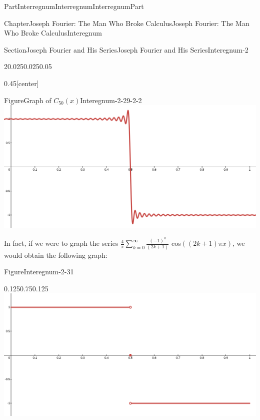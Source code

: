\documentclass[oneside,10pt,]{book}
\numberwithin{equation}{part}
\begin{document}
\begin{partptx}{Part}{Interregnum}{}{Interregnum}{}{}{InterregnumPart}
\begin{chapterptx}{Chapter}{Joseph Fourier: The Man Who Broke Calculus}{}{Joseph Fourier: The Man Who Broke Calculus}{}{}{Interegnum}
\begin{sectionptx}{Section}{Joseph Fourier and His Series}{}{Joseph Fourier and His Series}{}{}{Interegnum-2}
\begin{sidebyside}{2}{0.025}{0.025}{0.05}
\begin{sbspanel}{0.45}[center]
\begin{panelfigureptx}{Figure}{Graph of \(C_{50}(x)\)}{Interegnum-2-29-2-2}{}
\noindent\includegraphics[width=\linewidth]{external/images/FourierEx9-1.png}
\tcblower
\end{panelfigureptx}%
\end{sbspanel}%
\end{sidebyside}%
In fact, if we were to graph the series \(\frac{4}{\pi}\sum_{k=0}^\infty\frac{\left(-1\right)^k}{\left(2k+1\right)}\) cos\(\left(\left(2k+1\right)\pi x\right)\), we would obtain the following graph:%
\begin{figureptx}{Figure}{}{Interegnum-2-31}{}%
\begin{image}{0.125}{0.75}{0.125}{}%
\includegraphics[width=\linewidth]{external/images/FourierEx10-1.png}
\end{image}%
\tcblower
\end{figureptx}%

\end{sectionptx}
\end{chapterptx}
\end{partptx}
\end{document}
